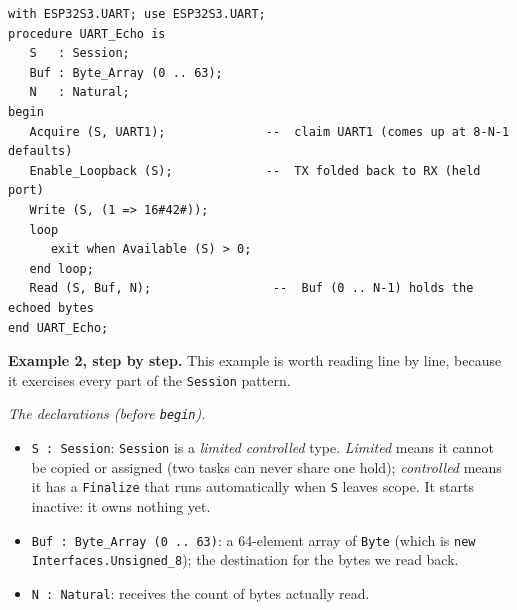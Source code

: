 \begin{lstlisting}
with ESP32S3.UART; use ESP32S3.UART;
procedure UART_Echo is
   S   : Session;
   Buf : Byte_Array (0 .. 63);
   N   : Natural;
begin
   Acquire (S, UART1);              --  claim UART1 (comes up at 8-N-1 defaults)
   Enable_Loopback (S);             --  TX folded back to RX (held port)
   Write (S, (1 => 16#42#));
   loop
      exit when Available (S) > 0;
   end loop;
   Read (S, Buf, N);                 --  Buf (0 .. N-1) holds the echoed bytes
end UART_Echo;
\end{lstlisting}

\textbf{Example 2, step by step.} This example is worth reading line by line,
because it exercises every part of the \texttt{Session} pattern.

\emph{The declarations (before \texttt{begin}).}
\begin{itemize}
\item \texttt{S : Session}: \texttt{Session} is a \emph{limited controlled}
  type. \emph{Limited} means it cannot be copied or assigned (two tasks can
  never share one hold); \emph{controlled} means it has a \texttt{Finalize} that
  runs automatically when \texttt{S} leaves scope. It starts inactive: it
  owns nothing yet.
\item \texttt{Buf : Byte\_Array (0 .. 63)}: a 64-element array of
  \texttt{Byte} (which is \texttt{new Interfaces.Unsigned\_8}); the destination
  for the bytes we read back.
\item \texttt{N : Natural}: receives the count of bytes actually read.
\end{itemize}

